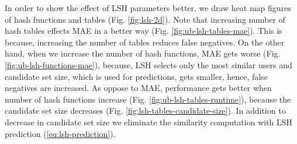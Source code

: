 \documentclass[conference]{IEEEtran}
\begin{document}
In order to show the effect of LSH parameters better, we draw heat map figures 
of hash functions and tables (Fig. \ref{fig:lsh-2d}). Note that increasing number 
of hash tables effects MAE in a better way (Fig. \ref{fig:ub-lsh-tables-mae}). 
This is because, increasing the number of tables reduces false negatives. On 
the other hand, when we increase the number of hash functions, MAE gets worse 
(Fig. \ref{fig:ub-lsh-functions-mae}), because, LSH selects only the most similar 
users and candidate set size, which is used for predictions, gets smaller, hence, 
false negatives are increased. As oppose to MAE, performance gets better when 
number of hash functions increase (Fig. \ref{fig:ub-lsh-tables-runtime}), because 
the candidate set size decreases (Fig. \ref{fig:lsh-tables-candidate-size}). 
In addition to decrease in candidate set size we eliminate the similarity 
computation with LSH prediction (\ref{eq:lsh-prediction}).
\end{document}
